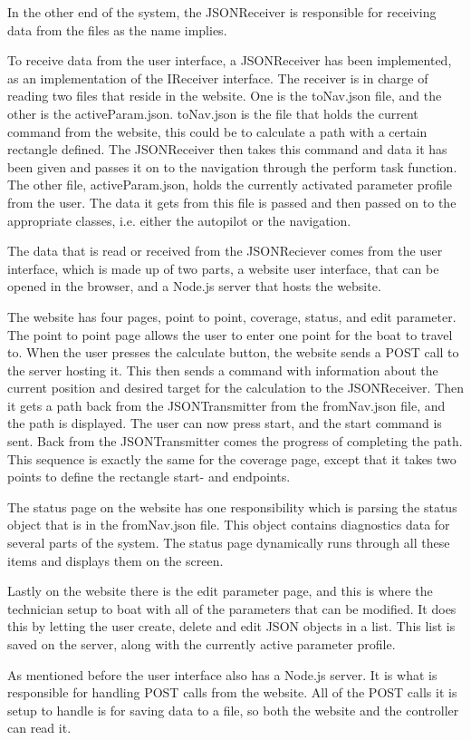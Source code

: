 In the other end of the system, the JSONReceiver is responsible for receiving data from the files as the name implies.

To receive data from the user interface, a JSONReceiver has been implemented, as an implementation of the IReceiver interface. The receiver is in charge of reading two files that reside in the website. One is the toNav.json file, and the other is the activeParam.json. toNav.json is the file that holds the current command from the website, this could be to calculate a path with a certain rectangle defined. The JSONReceiver then takes this command and data it has been given and passes it on to the navigation through the perform task function. The other file, activeParam.json, holds the currently activated parameter profile from the user. The data it gets from this file is passed and then passed on to the appropriate classes, i.e. either the autopilot or the navigation.

The data that is read or received from the JSONReciever comes from the user interface, which is made up of two parts, a website user interface, that can be opened in the browser, and a Node.js server that hosts the website. 

The website has four pages, point to point, coverage, status, and edit parameter. The point to point page allows the user to enter one point for the boat to travel to. When the user presses the calculate button, the website sends a POST call to the server hosting it. This then sends a command with information about the current position and desired target for the calculation to the JSONReceiver. Then it gets a path back from the JSONTransmitter from the fromNav.json file, and the path is displayed. The user can now press start, and the start command is sent. Back from the JSONTransmitter comes the progress of completing the path. This sequence is exactly the same for the coverage page, except that it takes two points to define the rectangle start- and endpoints. 

The status page on the website has one responsibility which is parsing the status object that is in the fromNav.json file. This object contains diagnostics data for several parts of the system. The status page dynamically runs through all these items and displays them on the screen.

Lastly on the website there is the edit parameter page, and this is where the technician setup to boat with all of the parameters that can be modified. It does this by letting the user create, delete and edit JSON objects in a list. This list is saved on the server, along with the currently active parameter profile. 

As mentioned before the user interface also has a Node.js server\cite{nodejs}. It is what is responsible for handling POST calls from the website. All of the POST calls it is setup to handle is for saving data to a file, so both the website and the controller can read it.



